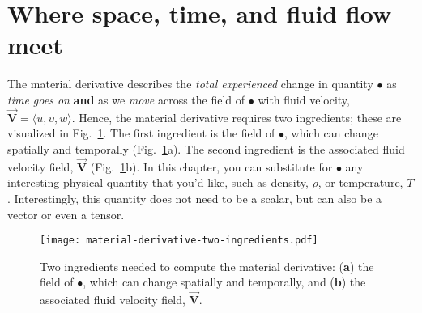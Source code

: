 \section{Where space, time, and fluid flow meet}

The material derivative describes the \textit{total experienced} change in quantity $\bullet$ as \textit{time goes on} \textbf{and} as we \textit{move} across the field of $\bullet$ with fluid velocity, $\vec{\bm{V}} = \langle u, \upsilon, w \rangle$. Hence, the material derivative requires two ingredients; these are visualized in Fig.~\ref{fig:material-derivative-two-ingredients}. The first ingredient is the field of $\bullet$, which can change spatially and temporally (Fig.~\ref{fig:material-derivative-two-ingredients}a). The second ingredient is the associated fluid velocity field, $\vec{\bm{V}}$ (Fig.~\ref{fig:material-derivative-two-ingredients}b). In this chapter, you can substitute for $\bullet$ any interesting physical quantity that you'd like, such as density, $\rho$, or temperature, $T$. Interestingly, this quantity does not need to be a scalar, but can also be a vector or even a tensor.
\begin{figure}[H]
\centering\texttt{[image: material-derivative-two-ingredients.pdf]}
\caption{Two ingredients needed to compute the material derivative: (\textbf{a}) the field of $\bullet$, which can change spatially and temporally, and (\textbf{b}) the associated fluid velocity field, $\vec{\bm{V}}$.}
\label{fig:material-derivative-two-ingredients}
\end{figure}

